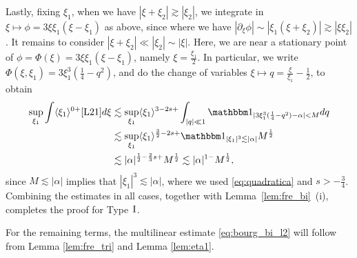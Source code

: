 \documentclass[a4paper,
11pt,  reqno]{amsart}
\newcommand{\I}{\hspace{0.2mm}\textup{I}\hspace{0.2mm}}
\newcommand{\5}{\textup{V}}
\newcommand{\ind}{\mathbbm 1}
\newcommand{\les}{\lesssim}
\theoremstyle{remark}
\newcommand{\al}{\alpha}
\newcommand{\ges}{\gtrsim}
\newcommand{\jb}[1]
{\langle #1 \rangle}
\numberwithin{equation}{section}
\numberwithin{theorem}{section}
\begin{document}
Lastly, fixing $\xi_1$, when we have $|\xi+\xi_2| \ges |\xi_2|$, we integrate in $\xi \mapsto \phi = 3 \xi \xi_1 (\xi-\xi_1)$ as above, since
where we have $|\partial_\xi \phi | \sim |\xi_1 (\xi + \xi_2)| \ges |\xi \xi_2|$. 
It remains to consider $|\xi + \xi_2| \ll |\xi_2| \sim |\xi|$. Here, we are near a stationary point of $\phi = \Phi(\xi) = 3 \xi \xi_1 (\xi-\xi_1)$, namely $\xi = \frac{\xi_1}{2}$. 
In particular, we write $\Phi(\xi, \xi_1) =3  \xi_1^3 (\frac14 - q^2)$, and do the change of variables $\xi \mapsto q = \frac{\xi}{\xi_1} - \frac12$, to obtain 
\begin{align}
\sup_{\xi_1} \int \jb{\xi_1}^{0+} \eqref{L21} d\xi 
&
\les 
\sup_{\xi_1} \jb{\xi_1}^{3-2s + }  \int_{|q| \ll 1} \ind_{| 3 \xi_1^3 (\frac14 - q^2) - \al| < M } d q
\\
&
\les 
\sup_{\xi_1} \jb{\xi_1}^{\frac32 -2s + } \ind_{|\xi_1|^3 \les |\al|} M^\frac12
\\
&
\les 
|\al|^{\frac12 - \frac23 s +} M^\frac12
\les |\al|^{1-} M^{\frac12}, 
\end{align}
since $M \les |\al|$ implies that $|\xi_1|^3 \les |\al|$, where we 
used  \eqref{eq:quadratica} and   $s>-\frac34$.
Combining the estimates in all cases, together with Lemma~\ref{lem:fre_bi}~(i), completes the proof for Type $\I$.



\medskip

For the remaining terms, the multilinear estimate \eqref{eq:bourg_bi_l2} will follow from Lemma \ref{lem:fre_tri} and Lemma \ref{lem:eta1}.

\medskip
\end{document}
